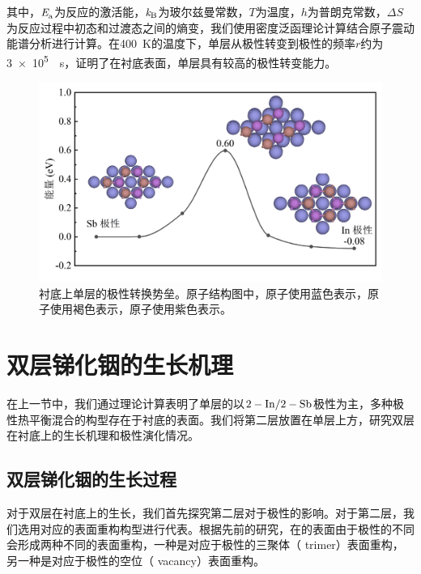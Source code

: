 其中，$\it E_{\rm a}^{\rm } \it$为反应的激活能，$\it k_{\rm B} \it$为玻尔兹曼常数，$T$为温度，$h$为普朗克常数，$\Delta S$为反应过程中初态和过渡态之间的熵变，我们使用密度泛函理论计算结合原子震动能谱分析进行计算。在\SI{400}{\kelvin}的温度下，单层从极性转变到极性的频率$r$约为\SI{3e5}{\per\second}，证明了在衬底表面，单层具有较高的极性转变能力。

\begin{figure}[!htb]
    \includegraphics{pic/IS_DFT_1InSb_flipBarrier.png}
    \caption{衬底上单层的极性转换势垒。原子结构图中，原子使用蓝色表示，原子使用褐色表示，原子使用紫色表示。}
    \label{fig:IS_DFT_1LInSb_InPtoSbPNeb}
\end{figure}

\section{双层锑化铟的生长机理}
在上一节中，我们通过理论计算表明了单层的以$\rm 2-In/2-Sb$极性为主，多种极性热平衡混合的构型存在于衬底的表面。我们将第二层放置在单层上方，研究双层在衬底上的生长机理和极性演化情况。

\subsection{双层锑化铟的生长过程}
对于双层在衬底上的生长，我们首先探究第二层对于极性的影响。对于第二层，我们选用对应的表面重构构型进行代表。根据先前的研究，在的表面由于极性的不同会形成两种不同的表面重构，一种是对应于极性的三聚体（ trimer）表面重构，另一种是对应于极性的空位（ vacancy）表面重构。

